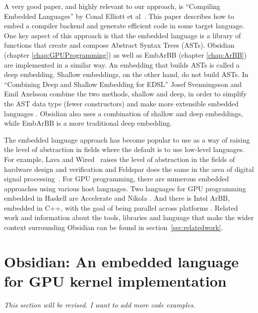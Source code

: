 \documentclass[a4paper]{book}
\begin{document}
A very good paper, and highly relevant to our approach, is ``Compiling Embedded Languages''
by Conal Elliott et al~\citet{COMPILEEDSL}. This paper describes how to embed a compiler 
backend and generate efficient code in some target language. One key aspect of this 
approach is that the embedded language is a library of functions that create and 
compose Abstract Syntax Trees (ASTs). Obsidian (chapter \ref{chap:GPUProgramming}) as 
well as EmbArBB (chapter \ref{chap:ArBB}) are implemented in a similar way. An 
embedding that builds ASTs is called a deep embedding. Shallow embeddings, on the 
other hand, do not build ASTs. In ``Combining Deep and Shallow Embedding for EDSL'' 
Josef Svenningsson and Emil Axelsson combine the two methods, shallow and deep, 
in order to simplify the AST data type (fewer constructors) and make more extensible 
embedded languages \citet{DEEPSHALLOW}. Obsidian also uses a combination of shallow 
and deep embeddings, while EmbArBB is a more traditional deep embedding. 

The embedded language approach has become popular to use as a way of raising the 
level of abstraction in fields where the default is to use low-level languages. 
For example, Lava and Wired~\citet{LAVA,Wired} raises the level of abstraction in the 
fields of hardware design and verification and Feldspar does the same in the area of  digital 
signal processing~\citet{FELDSPAR2010}. For GPU programming, there are numerous 
embedded approaches using various host languages. Two languages for GPU programming 
embedded in Haskell are  Accelerate and Nikola \citet{ACCELERATEDAMP11, NIKOLA}. 
And there is Intel ArBB, embedded in C++, with the goal of being parallel across 
platforms \citet{ARBB2011}. Related work and information about the tools, libraries 
and language that make the wider context surrounding Obsidian can be found in 
section~\ref{sec:relatedwork}. 

%
%
\section{Obsidian: An embedded language for GPU kernel implementation}

\vspace{5mm} 
\emph{This section will be revised. I want to add more code examples.} 
\vspace{5mm} 
\end{document}
